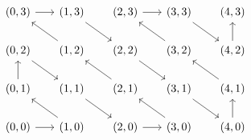 \[
  \begin{tikzcd}[row sep=1.7em, column sep=1.7em]
  (0,3) \arrow[r]  & (1,3) \arrow[dr] & (2,3) \arrow[r]  & (3,3) \arrow[dr] & (4,3) \\
  (0,2) \arrow[dr] & (1,2) \arrow[ul] & (2,2) \arrow[dr] & (3,2) \arrow[ul] & (4,2) \arrow[u] \\
  (0,1) \arrow[u]  & (1,1) \arrow[dr] & (2,1) \arrow[ul] & (3,1) \arrow[dr] & (4,1) \arrow[ul] \\
  (0,0) \arrow[r]  & (1,0) \arrow[ul] & (2,0) \arrow[r]  & (3,0) \arrow[ul] & (4,0) \arrow[u]
  \end{tikzcd}
\]